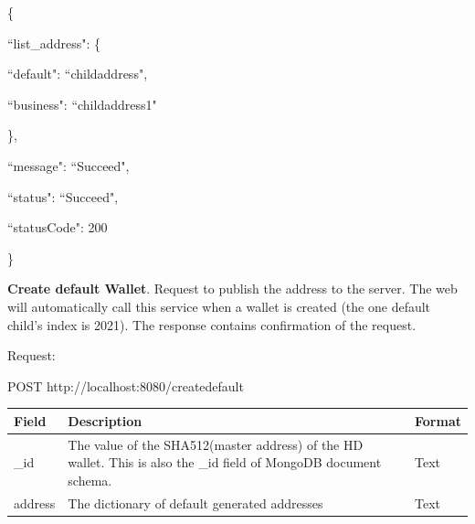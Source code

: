 \begin{framed}
    \hspace*{13mm}        \{\par
    \hspace*{13mm}          ``list\_address": \{ \par
    \hspace*{18mm}        ``default": ``childaddress", \par
    \hspace*{18mm}        ``business": ``childaddress1"    \par
    \hspace*{18mm}        \},\par
    \hspace*{13mm}                ``message": ``Succeed",   \par
    \hspace*{13mm}                ``status": ``Succeed",  \par
    \hspace*{13mm}             ``statusCode": 200   \par
    \hspace*{13mm}                 \}    \par

\end{framed}
    
\bigskip
{\textbf{Create default Wallet}}. Request to publish the address to the server. The web will automatically call this service when a wallet is created (the one default child’s index is 2021). The response contains confirmation of the request.

Request:

\begin{framed}
    POST http://localhost:8080/createdefault
\end{framed}

\begin{tabular}{m{3cm}  m{9cm} m{2.6cm} }
    \toprule
    Field & Description & Format                                            \\ 
    \midrule
    \_id & The value of the SHA512(master address) of the HD wallet. This is also the \_id field of MongoDB document schema.  & Text   \\ 
    address   & The dictionary of default generated addresses & Text    \\ 
    \bottomrule
\end{tabular}
\bigskip

